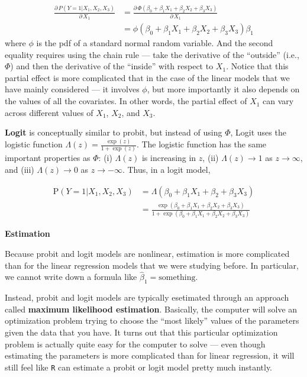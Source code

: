 \documentclass[
  letterpaper,
  DIV=11,
  numbers=noendperiod]{scrreprt}
\begin{document}
\[
  \begin{aligned}
  \frac{ \partial \, P(Y=1|X_1,X_2,X_3)}{\partial \, X_1} &= \frac{\partial \, \Phi(\beta_0 + \beta_1 X_1 + \beta_2 X_2 + \beta_3 X_3)}{\partial \, X_1} \\
  &= \phi(\beta_0 + \beta_1 X_1 + \beta_2 X_2 + \beta_3 X_3) \beta_1
  \end{aligned}
\] where \(\phi\) is the pdf of a standard normal random variable. And
the second equality requires using the chain rule --- take the
derivative of the ``outside'' (i.e., \(\Phi\)) and then the derivative
of the ``inside'' with respect to \(X_1\). Notice that this partial
effect is more complicated that in the case of the linear models that we
have mainly considered --- it involves \(\phi\), but more importantly it
also depends on the values of all the covariates. In other words, the
partial effect of \(X_1\) can vary across different values of \(X_1\),
\(X_2\), and \(X_3\).

\textbf{Logit} is conceptually similar to probit, but instead of using
\(\Phi\), Logit uses the logistic function
\(\Lambda(z) = \frac{\exp(z)}{1+\exp(z)}\). The logistic function has
the same important properties as \(\Phi\): (i) \(\Lambda(z)\) is
increasing in \(z\), (ii) \(\Lambda(z) \rightarrow 1\) as
\(z \rightarrow \infty\), and (iii) \(\Lambda(z) \rightarrow 0\) as
\(z \rightarrow -\infty\). Thus, in a logit model,

\[
  \begin{aligned}
  \mathrm{P}(Y=1 | X_1, X_2, X_3) &= \Lambda(\beta_0 + \beta_1 X_1 + \beta_2 + \beta_3 X_3) \\
  &= \frac{\exp(\beta_0 + \beta_1 X_1 + \beta_2 X_2 + \beta_3 X_3)}{1+\exp(\beta_0 + \beta_1 X_1 + \beta_2 X_2 + \beta_3 X_3)}
  \end{aligned}
\]

\textbf{Estimation}

Because probit and logit models are nonlinear, estimation is more
complicated than for the linear regression models that we were studying
before. In particular, we cannot write down a formula like
\(\hat{\beta}_1 = \textrm{something}\).

Instead, probit and logit models are typically esetimated through an
approach called \textbf{maximum likelihood estimation}. Basically, the
computer will solve an optimization problem trying to choose the ``most
likely'' values of the parameters given the data that you have. It turns
out that this particular optimization problem is actually quite easy for
the computer to solve --- even though estimating the parameters is more
complicated than for linear regression, it will still feel like
\texttt{R} can estimate a probit or logit model pretty much instantly.
\end{document}
